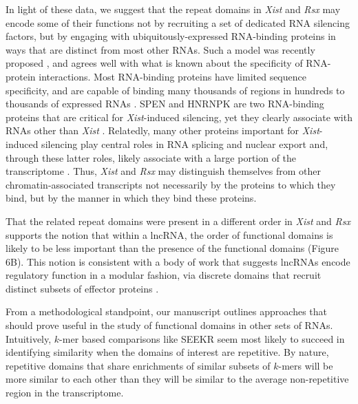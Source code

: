 In light of these data, we suggest that the repeat domains in \emph{Xist} and \emph{Rsx} may encode some of their functions not by recruiting a set of dedicated RNA silencing factors, but by engaging with ubiquitously-expressed RNA-binding proteins in ways that are distinct from most other RNAs. Such a model was recently proposed \cite{Brockdorff2018LocalNcRNA}, and agrees well with what is known about the specificity of RNA-protein interactions. Most RNA-binding proteins have limited sequence specificity, and are capable of binding many thousands of regions in hundreds to thousands of expressed RNAs \cite{Dominguez2018SequenceProteins,Ray2013ARegulation,VanNostrand2016RobusteCLIP}. SPEN and HNRNPK are two RNA-binding proteins that are critical for \emph{Xist}-induced silencing, yet they clearly associate with RNAs other than \emph{Xist} \cite{Cirillo2016QuantitativeEditor,VanNostrand2016RobusteCLIP}. Relatedly, many other proteins important for \emph{Xist}-induced silencing play central roles in RNA splicing and nuclear export and, through these latter roles, likely associate with a large portion of the transcriptome \cite{Moindrot2015ASilencing}. Thus, \emph{Xist} and \emph{Rsx} may distinguish themselves from other chromatin-associated transcripts not necessarily by the proteins to which they bind, but by the manner in which they bind these proteins.

That the related repeat domains were present in a different order in \emph{Xist} and \emph{Rsx} supports the notion that within a lncRNA, the order of functional domains is likely to be less important than the presence of the functional domains (Figure 6B). This notion is consistent with a body of work that suggests lncRNAs encode regulatory function in a modular fashion, via discrete domains that recruit distinct subsets of effector proteins \cite{Hacisuleyman2016FunctionLocus,Hezroni2015PrinciplesSpecies,Johnson2014TheRNAs,Kelley2014TransposableInteractions,Kirk2018FunctionalContent,Liu2017VisualizingRepA,Lu2016RNAStructure,Lubelsky2018SequencesCells,Patil2016M6Repression,Pintacuda2017HnRNPKSilencing, Smola2016SHAPECells,Somarowthu2015HOTAIRStructure,Tsai2010LongComplexes, Wutz2002ChromosomalRNA}.

From a methodological standpoint, our manuscript outlines approaches that should prove useful in the study of functional domains in other sets of RNAs. Intuitively, $k$-mer based comparisons like SEEKR seem most likely to succeed in identifying similarity when the domains of interest are repetitive. By nature, repetitive domains that share enrichments of similar subsets of $k$-mers will be more similar to each other than they will be similar to the average non-repetitive region in the transcriptome. 

